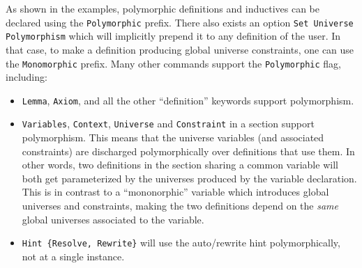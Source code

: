 As shown in the examples, polymorphic definitions and inductives can be
declared using the \texttt{Polymorphic} prefix. There also exists an
option \texttt{Set Universe Polymorphism} which will implicitly prepend
it to any definition of the user. In that case, to make a definition
producing global universe constraints, one can use the
\texttt{Monomorphic} prefix. Many other commands support the
\texttt{Polymorphic} flag, including:

\begin{itemize}
\item \texttt{Lemma}, \texttt{Axiom}, and all the other ``definition''
  keywords support polymorphism.
\item \texttt{Variables}, \texttt{Context}, \texttt{Universe} and
  \texttt{Constraint} in a section support polymorphism.  This means
  that the universe variables (and associated constraints) are
  discharged polymorphically over definitions that use them. In other
  words, two definitions in the section sharing a common variable will
  both get parameterized by the universes produced by the variable
  declaration. This is in contrast to a ``mononorphic'' variable which
  introduces global universes and constraints, making the two
  definitions depend on the \emph{same} global universes associated to
  the variable.
\item \texttt{Hint \{Resolve, Rewrite\}} will use the auto/rewrite hint
  polymorphically, not at a single instance.
\end{itemize}


